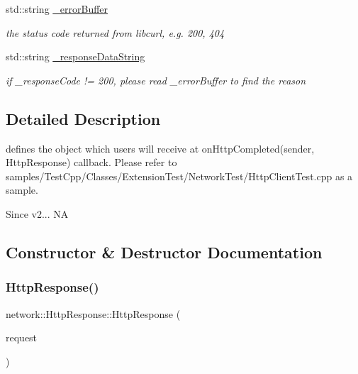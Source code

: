 \begin{DoxyCompactItemize}
\mbox{\label{classnetwork_1_1HttpResponse_aad4afb0a88fd140d4eadb5b2899fe6f5}} 
std\+::string \hyperlink{classnetwork_1_1HttpResponse_aad4afb0a88fd140d4eadb5b2899fe6f5}{\+\_\+error\+Buffer}
\begin{DoxyCompactList}\small\item\em the status code returned from libcurl, e.\+g. 200, 404 \end{DoxyCompactList}\item 
\mbox{\label{classnetwork_1_1HttpResponse_a5507af5d92552d0d1ca6c687c95071df}} 
std\+::string \hyperlink{classnetwork_1_1HttpResponse_a5507af5d92552d0d1ca6c687c95071df}{\+\_\+response\+Data\+String}
\begin{DoxyCompactList}\small\item\em if \+\_\+response\+Code != 200, please read \+\_\+error\+Buffer to find the reason \end{DoxyCompactList}\end{DoxyCompactItemize}


\subsection{Detailed Description}
defines the object which users will receive at on\+Http\+Completed(sender, Http\+Response) callback. Please refer to samples/\+Test\+Cpp/\+Classes/\+Extension\+Test/\+Network\+Test/\+Http\+Client\+Test.\+cpp as a sample. 

\begin{DoxySince}{Since}
v2...  NA 
\end{DoxySince}


\subsection{Constructor \& Destructor Documentation}
\mbox{\label{classnetwork_1_1HttpResponse_a6d9176e90ac973214c91496bb2dee460}} 
\subsubsection{\texorpdfstring{Http\+Response()}{HttpResponse()}\hspace{0.1cm}{\footnotesize\ttfamily [1/2]}}
{\footnotesize\ttfamily network\+::\+Http\+Response\+::\+Http\+Response (\begin{DoxyParamCaption}\item[{\hyperlink{classnetwork_1_1HttpRequest}{Http\+Request} $\ast$}]{request }\end{DoxyParamCaption})\hspace{0.3cm}{\ttfamily [inline]}}


